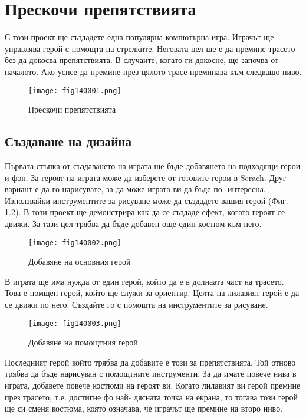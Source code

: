 \chapter{Прескочи препятствията}

С този проект ще създадете една популярна компютърна игра. Играчът ще управлява герой с помощта на стрелките. Неговата цел ще е да премине трасето без да докосва препятствията. В случаите, когато ги докосне, ще започва от началото. Ако успее да премине през цялото трасе преминава към следващо ниво.

\begin{figure}[H]
  \centering
  \texttt{[image: fig140001.png]}
  \caption{Прескочи препятствията}
\label{fig140001}
\end{figure}

\section{Създаване на дизайна}
Първата стъпка от създаването на играта ще бъде добавянето на подходящи герои и фон. За героят на играта може да изберете от готовите герои в Scrach. Друг вариант е да го нарисувате, за да може играта ви да бъде по- интересна. Използвайки инструментите за рисуване може да създадете вашия герой (Фиг. \ref{fig140002}). В този проект ще демонстрира как да се създаде ефект, когато героят се движи. За тази цел трябва да бъде добавен още един костюм към него.

\begin{figure}[H]
  \centering
  \texttt{[image: fig140002.png]}
  \caption{Добавяне на основния герой}
\label{fig140002}
\end{figure}

В играта ще има нужда от един герой, който да е в долнаата част на трасето. Това е помщен герой, който ще служи за ориентир. Целта на лилавият герой е да се движи по него. Създайте го с помощта на инструментите за рисуване.

\begin{figure}[H]
  \centering
  \texttt{[image: fig140003.png]}
  \caption{Добавяне на помощтния герой}
\label{fig140003}
\end{figure}

Последният герой който трябва да добавите е този за препятствията. Той отново трябва да бъде нарисуван с помощтните инструменти. За да имате повече нива в играта, добавете повече костюми на героят ви. Когато лилавият ви герой премине през трасето, т.е. достигне фо най- дясната точка на екрана, то тогава този герой ще си сменя костюма, която означава, че играчът ще премине на второ ниво.

